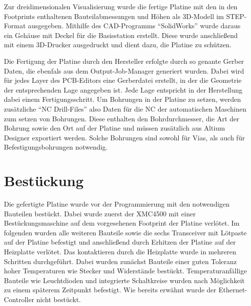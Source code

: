 Zur dreidimensionalen Visualisierung wurde die fertige Platine mit den in den Footprints enthaltenen Bauteilabmessungen und Höhen als 3D-Modell im \ac{STEP}-Format ausgegeben. Mithilfe des \ac{CAD}-Programms \enquote{SolidWorks} wurde daraus ein Gehäuse mit Deckel für die Basisstation erstellt. Diese wurde anschließend mit einem 3D-Drucker ausgedruckt und dient dazu, die Platine zu schützen.

Die Fertigung der Platine durch den Hersteller erfolgte durch so genante Gerber Daten, die ebenfals aus dem Output-Job-Manager generiert wurden. Dabei wird für jedes Layer des \ac{PCB}-Editors eine Gerberdatei erstellt, in der die Geometrie der entsprechenden Lage angegeben ist. Jede Lage entspricht in der Herstellung dabei einem Fertigungsschritt. Um Bohrungen in der Platine zu setzen, werden zusätzliche \enquote{NC Drill-Files} also Daten für die \ac{NC} der automatischen Maschinen zum setzen von Bohrungen. Diese enthalten den Bohrdurchmesser, die Art der Bohrung sowie den Ort auf der Platine und müssen zusätzlich aus Altium Designer exportiert werden. Solche Bohrungen sind sowohl für Vias, als auch für Befestigungsbohrungen notwendig.


\section{Bestückung}
Die gefertigte Platine wurde vor der Programmierung mit den notwendigen Bauteilen bestückt. Dabei wurde zuerst der XMC4500 mit einer Bestückungsmaschine auf dem vorgesehenen Footprint der Platine verlötet. Im folgenden wurden alle weiteren Bauteile sowie die sechs Transceiver mit Lötpaste auf der Platine befestigt und anschließend durch Erhitzen der Platine auf der Heizplatte verlötet. Das kontaktieren durch die Heizplatte wurde in mehreren Schritten durchgeführt. Dabei wurden zunächst Bauteile einer guten Toleranz hoher Temperaturen wie Stecker und Widerstände bestückt. Temperaturanfällige Bauteile wie Leuchtdioden und integrierte Schaltkreise wurden nach Möglichkeit zu einem späterem Zeitpunkt befestigt. Wie bereits erwähnt wurde der Ethernet-Controller nicht bestückt.

